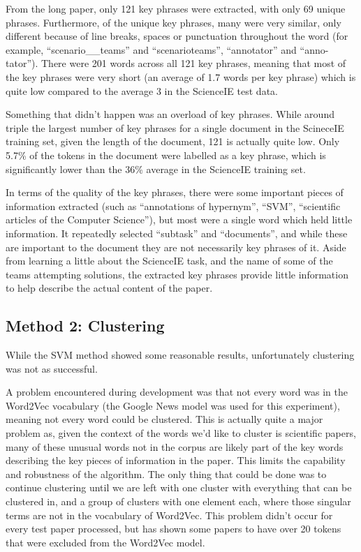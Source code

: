 From the long paper, only 121 key phrases were extracted, with only 69 unique phrases. Furthermore, of the unique key phrases, many were very similar, only different because of line breaks, spaces or punctuation throughout the word (for example, ``scenario\_\_teams'' and ``scenario\-teams'', ``annotator'' and ``anno-tator''). There were 201 words across all 121 key phrases, meaning that most of the key phrases were very short (an average of 1.7 words per key phrase) which is quite low compared to the average 3 in the ScienceIE test data. 

Something that didn't happen was an overload of key phrases. While around triple the largest number of key phrases for a single document in the ScineceIE training set, given the length of the document, 121 is actually quite low. Only 5.7\% of the tokens in the document were labelled as a key phrase, which is significantly lower than the 36\% average in the ScienceIE training set.

In terms of the quality of the key phrases, there were some important pieces of information extracted (such as ``annotations of hypernym'', ``SVM'', ``scientific articles of the Computer Science''), but most were a single word which held little information. It repeatedly selected ``subtask'' and ``documents'', and while these are important to the document they are not necessarily key phrases of it. Aside from learning a little about the ScienceIE task, and the name of some of the teams attempting solutions, the extracted key phrases provide little information to help describe the actual content of the paper.

\subsection{Method 2: Clustering}
While the SVM method showed some reasonable results, unfortunately clustering was not as successful. 

A problem encountered during development was that not every word was in the Word2Vec vocabulary (the Google News model was used for this experiment), meaning not every word could be clustered. This is actually quite a major problem as, given the context of the words we'd like to cluster is scientific papers, many of these unusual words not in the corpus are likely part of the key words describing the key pieces of information in the paper. This limits the capability and robustness of the algorithm. The only thing that could be done was to continue clustering until we are left with one cluster with everything that can be clustered in, and a group of clusters with one element each, where those singular terms are not in the vocabulary of Word2Vec. This problem didn't occur for every test paper processed, but has shown some papers to have over 20 tokens that were excluded from the Word2Vec model. 

